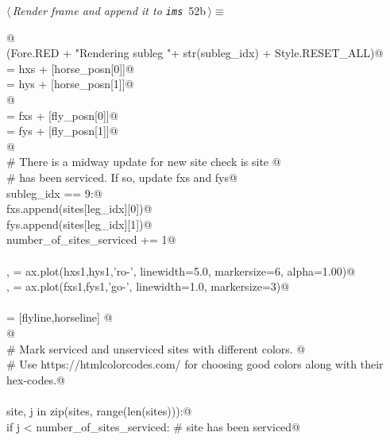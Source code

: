 \documentclass[11.5pt]{report}
\begin{document}
\begin{flushleft} \small\label{scrap67}\raggedright\small
{} $\langle\,${\itshape Render frame and append it to \verb|ims|}\nobreak\ {\footnotesize {52b}}$\,\rangle\equiv$
\vspace{-1ex}
\begin{list}{}{} \item
\mbox{}\verb@   @\\
\mbox{}\verb@debug(Fore.RED + "Rendering subleg "+ str(subleg_idx) + Style.RESET_ALL)@\\
\mbox{} = hxs + [horse_posn[0]]@\\
\mbox{} = hys + [horse_posn[1]]@\\
\mbox{}\verb@               @\\
\mbox{} = fxs + [fly_posn[0]]@\\
\mbox{} = fys + [fly_posn[1]]@\\
\mbox{}\verb@                 @\\
\mbox{}\verb@# There is a midway update for new site check is site @\\
\mbox{}\verb@# has been serviced. If so, update fxs and fys@\\
\mbox{}\verb@if subleg_idx == 9:@\\
\mbox{}\verb@    fxs.append(sites[leg_idx][0])@\\
\mbox{}\verb@    fys.append(sites[leg_idx][1])@\\
\mbox{}\verb@    number_of_sites_serviced += 1@\\
\mbox{}\verb@@\\
\mbox{}\verb@horseline, = ax.plot(hxs1,hys1,'ro-', linewidth=5.0, markersize=6, alpha=1.00)@\\
\mbox{}\verb@flyline,   = ax.plot(fxs1,fys1,'go-', linewidth=1.0, markersize=3)@\\
\mbox{}\verb@@\\
\mbox{}\verb@objs = [flyline,horseline] @\\
\mbox{}\verb@ @\\
\mbox{}\verb@# Mark serviced and unserviced sites with different colors. @\\
\mbox{}\verb@# Use https://htmlcolorcodes.com/ for choosing good colors along with their hex-codes.@\\
\mbox{}\verb@@\\
\mbox{}\verb@for site, j in zip(sites, range(len(sites))):@\\
\mbox{}\verb@    if j < number_of_sites_serviced:       # site has been serviced@\\

\end{list}
\end{flushleft}
\end{document}

